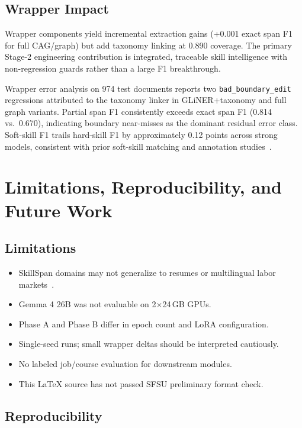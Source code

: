 \documentclass[12pt,oneside]{report}
\begin{document}
\section{Wrapper Impact}

Wrapper components yield incremental extraction gains (+0.001 exact span F1 for full CAG/graph) but add taxonomy linking at 0.890 coverage.
The primary Stage-2 engineering contribution is integrated, traceable skill intelligence with non-regression guards rather than a large F1 breakthrough.

Wrapper error analysis on 974 test documents reports two \texttt{bad\_boundary\_edit} regressions attributed to the taxonomy linker in GLiNER+taxonomy and full graph variants.
Partial span F1 consistently exceeds exact span F1 (0.814 vs.\ 0.670), indicating boundary near-misses as the dominant residual error class.
Soft-skill F1 trails hard-skill F1 by approximately 0.12 points across strong models, consistent with prior soft-skill matching and annotation studies~\cite{sayfullina2018softskill,calanca2019responsible}.

\chapter{Limitations, Reproducibility, and Future Work}
\label{ch:limits}

\section{Limitations}

\begin{itemize}
  \item SkillSpan domains may not generalize to resumes or multilingual labor markets~\cite{vasquezrodriguez2026sixlanguages,kavas2025multilingual}.
  \item Gemma 4 26B was not evaluable on 2$\times$24\,GB GPUs.
  \item Phase A and Phase B differ in epoch count and LoRA configuration.
  \item Single-seed runs; small wrapper deltas should be interpreted cautiously.
  \item No labeled job/course evaluation for downstream modules.
  \item This LaTeX source has not passed SFSU preliminary format check.
\end{itemize}

\section{Reproducibility}
\end{document}

